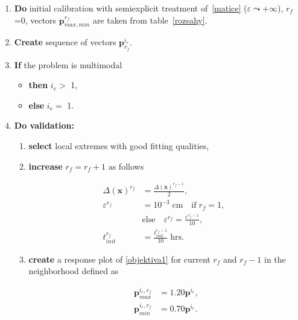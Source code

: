 \documentclass[review,times,3p,10pt]{elsarticle}
\newenvironment{lineq}
    {\begin{linenomath*}
    \begin{equation}
    }
    { 
    \end{equation} 
    \end{linenomath*}
    }
\renewcommand{\vec}{\mathbf}
\begin{document}
 \begin{enumerate}[label={\bf \Roman* .}]
    \item  {\bf Do} initial calibration with semiexplicit treatment of~\eqref{matice} ($\varepsilon \leadsto +\infty$), $r_f$=0,  vectors $\vec{p}_{max,min}^{r_f}$ are taken from table~\ref{rozsahy}. 
     \item \label{docal} {\bf Create}  sequence of vectors $\vec{p}^{i_e}_{r_f}$. 
     \item {\bf If} the problem is multimodal 
       \begin{itemize} 
           \item {\bf then} $i_e > $ 1, 
           \item {\bf else} $i_e = $ 1.
       \end{itemize} 
 \item {\bf Do validation:}  
    \begin{enumerate} 
      \item {\bf select} local extremes with good fitting qualities,
        \item {\bf increase} $r_f=r_f+1$ as follows 
                  \begin{lineq}
                  \label{coeffs}
                  \begin{split}
                  \Delta(\vec{x})^{r_f}  &= \frac{\Delta(\vec{x})^{r_f-1}}{2}, \\
                  \varepsilon^{r_f} &= 10^{-3} \; \mbox{cm} \quad  \mbox{if} \; r_f = 1, \; \; \\ &\mbox{else} \quad \varepsilon^{r_f} = \frac{\varepsilon^{r_f-1}}{10}, \\
                  t_{init}^{r_f} &=  \frac{t_{init}^{r_f-1}}{10} \; \mbox{hrs} .
                  \end{split}
                  \end{lineq}
        \item {\bf create} a response plot of \eqref{objektiva1} for current $r_f$ and $r_f-1$ in the neighborhood defined as 
            \begin{lineq}
            \label{parrange}
              \begin{split}
              \vec{p}^{i_e, r_f}_{max} &= 1.20\vec{p}^{i_e}, \\
              \vec{p}^{i_e,r_f}_{min} &= 0.70\vec{p}^{i_e}. 
              \end{split}
            \end{lineq}
            

\end{enumerate}
\end{enumerate}
\end{document}
